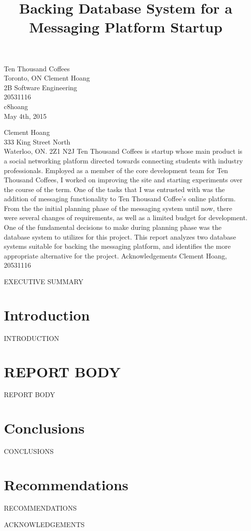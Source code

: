 \documentclass[12pt]{article}
\begin{document}
\title{Backing Database System for a Messaging Platform Startup}
{
	Ten Thousand Coffees\\
	Toronto, ON
}
{
	Clement Hoang\\
	2B Software Engineering\\
	20531116\\
	c8hoang\\
	May 4th, 2015
}


{
	\noindent
	Clement Hoang\\
	333 King Street North\\
	Waterloo, ON. 2Z1 N2J
}
{
	Ten Thousand Coffees is startup whose main product is a social networking platform directed towards connecting students with
	industry professionals. Employed as a member of the core development team for Ten Thousand Coffees, I worked on improving the site
	and starting experiments over the course of the term. One of the tasks that I was entrusted with was the addition of messaging functionality
	to Ten Thousand Coffee's online platform.
}
{
	From the the initial planning phase of the messaging system until now, there were several changes of requirements, as well as a limited
	budget for development. One of the fundamental decisions to make during planning phase was the database system to utilizes for this project.
	This report analyzes two database systems suitable for backing the messaging platform, and identifies the more
	appropriate alternative for the project.
}
{
	Acknowledgements
}
{
	Clement Hoang, 20531116
}


EXECUTIVE SUMMARY
\newpage


\toc


\section{Introduction}
INTRODUCTION


\section{REPORT BODY}
REPORT BODY


\section{Conclusions}
CONCLUSIONS


\section{Recommendations}
RECOMMENDATIONS


\newpage



\newpage


ACKNOWLEDGEMENTS
\newpage


\end{document}
